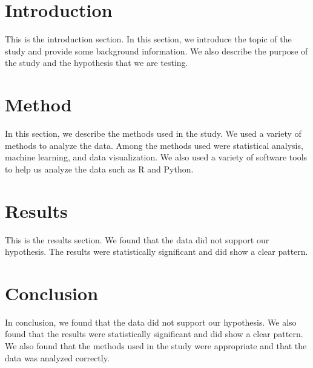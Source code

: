 \documentclass{article}
\begin{document}
\section{Introduction}
This is the introduction section. In this section, we introduce the topic of the study and provide some background information. We also describe the purpose of the study and the hypothesis that we are testing.

\section{Method}
In this section, we describe the methods used in the study. We used a variety of methods to analyze the data. Among the methods used were statistical analysis, machine learning, and data visualization. We also used a variety of software tools to help us analyze the data such as R and Python.

\section{Results}
This is the results section. We found that the data did not support our hypothesis. The results were statistically significant and did show a clear pattern.

\section{Conclusion}
In conclusion, we found that the data did not support our hypothesis. We also found that the results were statistically significant and did show a clear pattern. We also found that the methods used in the study were appropriate and that the data was analyzed correctly.
\end{document}
